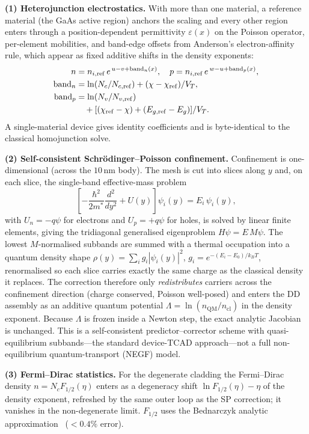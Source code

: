 \documentclass[conference]{IEEEtran}
\begin{document}
\textbf{(1) Heterojunction electrostatics.} With more than one material, a
reference material (the GaAs active region) anchors the scaling and every other
region enters through a position-dependent permittivity $\varepsilon(x)$ on the
Poisson operator, per-element mobilities, and band-edge offsets from Anderson's
electron-affinity rule, which appear as fixed additive shifts in the density
exponents:
\begin{align}
n &= n_{i,\mathrm{ref}}\,e^{\,u-v+\mathrm{band}_n(x)}, \quad
p = n_{i,\mathrm{ref}}\,e^{\,w-u+\mathrm{band}_p(x)},\\
\mathrm{band}_n &= \ln(N_c/N_{c,\mathrm{ref}}) + (\chi-\chi_{\mathrm{ref}})/V_T, \\
\mathrm{band}_p &= \ln(N_v/N_{v,\mathrm{ref}}) \notag\\
&\quad + [(\chi_{\mathrm{ref}}-\chi)+(E_{g,\mathrm{ref}}-E_g)]/V_T.
\end{align}
A single-material device gives identity coefficients and is byte-identical to the
classical homojunction solve.

\textbf{(2) Self-consistent Schr\"odinger--Poisson confinement.} Confinement is
one-dimensional (across the $10\,$nm body). The mesh is cut into slices along $y$
and, on each slice, the single-band effective-mass problem
\begin{equation}
\left[-\frac{\hbar^2}{2m^*}\frac{d^2}{dy^2}+U(y)\right]\psi_i(y)=E_i\,\psi_i(y),
\end{equation}
with $U_n=-q\psi$ for electrons and $U_p=+q\psi$ for holes, is solved by linear
finite elements, giving the tridiagonal generalised
eigenproblem $H\psi=E\,M\psi$. The lowest $M$-normalised subbands are summed with
a thermal occupation into a quantum density shape
$\rho(y)=\sum_i g_i|\psi_i(y)|^2$, $g_i=e^{-(E_i-E_0)/k_BT}$, renormalised so each
slice carries exactly the same charge as the classical density it replaces. The
correction therefore only \emph{redistributes} carriers across the confinement
direction (charge conserved, Poisson well-posed) and enters the DD assembly as an
additive quantum potential $\Lambda=\ln(n_{\mathrm{QM}}/n_{\mathrm{cl}})$ in the
density exponent. Because $\Lambda$ is frozen inside a Newton step, the exact
analytic Jacobian is unchanged. This is a self-consistent predictor--corrector
scheme with quasi-equilibrium subbands---the standard device-TCAD approach---not
a full non-equilibrium quantum-transport (NEGF) model.

\textbf{(3) Fermi--Dirac statistics.} For the degenerate cladding the Fermi--Dirac
density $n=N_c F_{1/2}(\eta)$ enters as a degeneracy shift
$\ln F_{1/2}(\eta)-\eta$ of the density exponent, refreshed by the same outer loop
as the SP correction; it vanishes in the non-degenerate limit. $F_{1/2}$ uses the
Bednarczyk analytic approximation~\cite{bednarczyk} ($<0.4\%$ error).
\end{document}
